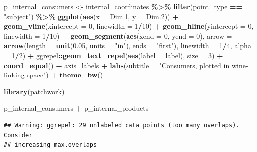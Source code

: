 \documentclass[
]{book}
\newenvironment{Shaded}{\begin{snugshade}}{\end{snugshade}}
\newcommand{\AttributeTok}[1]{\textcolor[rgb]{0.13,0.29,0.53}{#1}}
\newcommand{\DecValTok}[1]{\textcolor[rgb]{0.00,0.00,0.81}{#1}}
\newcommand{\FloatTok}[1]{\textcolor[rgb]{0.00,0.00,0.81}{#1}}
\newcommand{\FunctionTok}[1]{\textcolor[rgb]{0.13,0.29,0.53}{\textbf{#1}}}
\newcommand{\NormalTok}[1]{#1}
\newcommand{\OtherTok}[1]{\textcolor[rgb]{0.56,0.35,0.01}{#1}}
\newcommand{\SpecialCharTok}[1]{\textcolor[rgb]{0.81,0.36,0.00}{\textbf{#1}}}
\newcommand{\StringTok}[1]{\textcolor[rgb]{0.31,0.60,0.02}{#1}}
\begin{document}
\begin{Shaded}
\begin{Highlighting}[]
\NormalTok{p\_internal\_consumers }\OtherTok{\textless{}{-}} 
\NormalTok{  internal\_coordinates }\SpecialCharTok{\%\textgreater{}\%}
  \FunctionTok{filter}\NormalTok{(point\_type }\SpecialCharTok{==} \StringTok{"subject"}\NormalTok{) }\SpecialCharTok{\%\textgreater{}\%}
  \FunctionTok{ggplot}\NormalTok{(}\FunctionTok{aes}\NormalTok{(}\AttributeTok{x =}\NormalTok{ Dim}\FloatTok{.1}\NormalTok{, }\AttributeTok{y =}\NormalTok{ Dim}\FloatTok{.2}\NormalTok{)) }\SpecialCharTok{+} 
  \FunctionTok{geom\_vline}\NormalTok{(}\AttributeTok{xintercept =} \DecValTok{0}\NormalTok{, }\AttributeTok{linewidth =} \DecValTok{1}\SpecialCharTok{/}\DecValTok{10}\NormalTok{) }\SpecialCharTok{+} 
  \FunctionTok{geom\_hline}\NormalTok{(}\AttributeTok{yintercept =} \DecValTok{0}\NormalTok{, }\AttributeTok{linewidth =} \DecValTok{1}\SpecialCharTok{/}\DecValTok{10}\NormalTok{) }\SpecialCharTok{+}
  \FunctionTok{geom\_segment}\NormalTok{(}\FunctionTok{aes}\NormalTok{(}\AttributeTok{xend =} \DecValTok{0}\NormalTok{, }\AttributeTok{yend =} \DecValTok{0}\NormalTok{),}
               \AttributeTok{arrow =} \FunctionTok{arrow}\NormalTok{(}\AttributeTok{length =} \FunctionTok{unit}\NormalTok{(}\FloatTok{0.05}\NormalTok{, }\AttributeTok{units =} \StringTok{"in"}\NormalTok{), }\AttributeTok{ends =} \StringTok{"first"}\NormalTok{),}
               \AttributeTok{linewidth =} \DecValTok{1}\SpecialCharTok{/}\DecValTok{4}\NormalTok{, }\AttributeTok{alpha =} \DecValTok{1}\SpecialCharTok{/}\DecValTok{2}\NormalTok{) }\SpecialCharTok{+} 
\NormalTok{  ggrepel}\SpecialCharTok{::}\FunctionTok{geom\_text\_repel}\NormalTok{(}\FunctionTok{aes}\NormalTok{(}\AttributeTok{label =}\NormalTok{ label), }\AttributeTok{size =} \DecValTok{3}\NormalTok{) }\SpecialCharTok{+} 
  \FunctionTok{coord\_equal}\NormalTok{() }\SpecialCharTok{+} 
\NormalTok{  axis\_labels }\SpecialCharTok{+} 
  \FunctionTok{labs}\NormalTok{(}\AttributeTok{subtitle =} \StringTok{"Consumers, plotted in wine{-}linking space"}\NormalTok{) }\SpecialCharTok{+} 
  \FunctionTok{theme\_bw}\NormalTok{()}

\FunctionTok{library}\NormalTok{(patchwork)}

\NormalTok{p\_internal\_consumers }\SpecialCharTok{+}\NormalTok{ p\_internal\_products}
\end{Highlighting}
\end{Shaded}

\begin{verbatim}
## Warning: ggrepel: 29 unlabeled data points (too many overlaps). Consider
## increasing max.overlaps
\end{verbatim}
\end{document}
